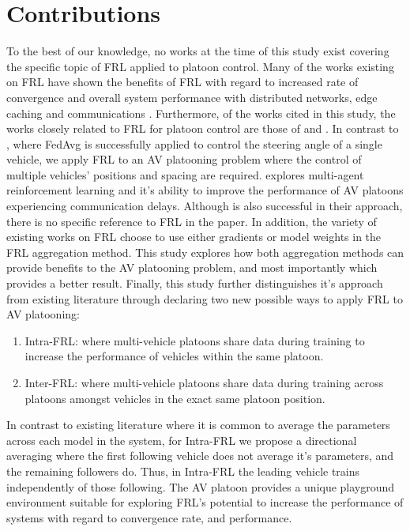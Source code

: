 \section{Contributions}
To the best of our knowledge, no works at the time of this study exist covering the 
specific topic of FRL applied to platoon control. Many of the works existing on FRL 
have shown the benefits of FRL with regard to increased rate of convergence and overall 
system performance with distributed networks, edge caching and communications 
\cite{ZhangX2020, LimHyun2021, WangXiaofei2021, Huang2021}.  Furthermore, of the works 
cited in this study, the works closely related to FRL for platoon control are those of 
\cite{Peake2020} and \cite{Liang2019}.  In contrast to \cite{Liang2019}, where FedAvg 
is successfully applied to control the steering angle of a single vehicle, we apply 
FRL to an AV platooning problem where the control of multiple vehicles' positions and 
spacing are required.  \cite{Peake2020} explores multi-agent reinforcement learning 
and it's ability to improve the performance of AV platoons experiencing communication delays.  
Although \cite{Peake2020} is also successful in their approach, there is no specific 
reference to FRL in the paper. In addition, the variety of existing works on FRL 
choose to use either gradients or model weights in the FRL aggregation method.  
This study explores how both aggregation methods can provide benefits to the AV 
platooning problem, and most importantly which provides a better result. Finally, this 
study further distinguishes it's approach from existing literature through declaring two 
new possible ways to apply FRL to AV platooning:

\begin{enumerate}
    \item Intra-FRL: where multi-vehicle platoons share data during training to increase 
    the performance of vehicles within the same platoon.
    \item Inter-FRL: where multi-vehicle platoons share data during training across 
    platoons amongst vehicles in the exact same platoon position. 
\end{enumerate}

In contrast to existing literature where it is common to average the parameters 
across each model in the system, for Intra-FRL we propose a directional averaging where 
the first following vehicle does not average it's parameters, and the remaining 
followers do. Thus, in Intra-FRL the leading vehicle trains independently of those 
following. The AV platoon provides a unique playground environment suitable for 
exploring FRL's potential to increase the performance of systems with regard to 
convergence rate, and performance.

